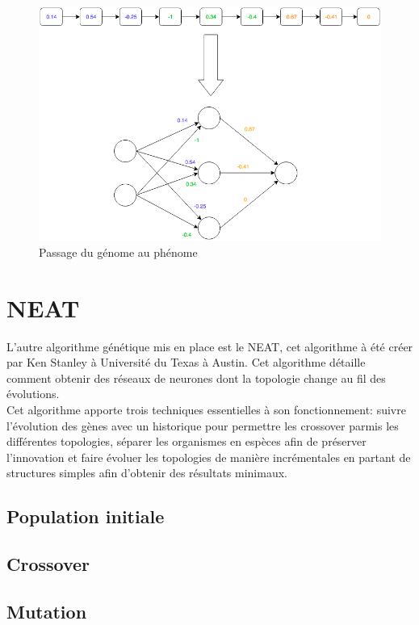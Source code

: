 \documentclass{article}
\begin{document}
\begin{figure}[h]
\begin{center}
	\includegraphics[scale=0.6]{genomephenome.png}
	\caption{Passage du génome au phénome}
\end{center}
\end{figure}

\section{NEAT}

L'autre algorithme génétique mis en place est le NEAT, cet algorithme à été créer par Ken Stanley à Université du Texas à Austin. Cet algorithme détaille comment obtenir des réseaux de neurones dont la topologie change au fil des évolutions.\\
Cet algorithme apporte trois techniques essentielles à son fonctionnement: suivre l'évolution des gènes avec un historique pour permettre les crossover parmis les différentes topologies, séparer les organismes en espèces afin de préserver l'innovation et faire évoluer les topologies de manière incrémentales en partant de structures simples afin d'obtenir des résultats minimaux.

\subsection{Population initiale}
\subsection{Crossover}
\subsection{Mutation}
\end{document}

